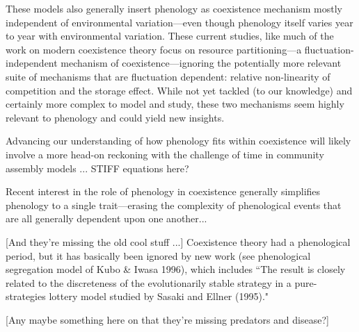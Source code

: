 \documentclass[11pt]{article}
\begin{document}
These models also generally insert phenology as coexistence mechanism mostly independent of environmental variation---even though phenology itself varies year to year with environmental variation. These current studies, like much of the work on modern coexistence theory focus on resource partitioning---a fluctuation-independent mechanism of coexistence---ignoring the potentially more relevant suite of mechanisms that are fluctuation dependent: relative non-linearity of competition and the storage effect. While not yet tackled (to our knowledge) and certainly more complex to model and study, these two mechanisms seem highly relevant to phenology and could yield new insights. 

Advancing our understanding of how phenology fits within coexistence will likely involve a more head-on reckoning with the challenge of time in community assembly models ... STIFF equations here? 

Recent interest in the role of phenology in coexistence generally simplifies phenology to a single trait---erasing the complexity of phenological events that are all generally dependent upon one another... 

[And they're missing the old cool stuff ...] Coexistence theory had a phenological period, but it has basically been ignored by new work (see phenological segregation model of Kubo \& Iwasa 1996), which includes ``The result is closely related to the discreteness of the evolutionarily stable strategy in a pure-strategies lottery model studied by Sasaki and Ellner (1995)." 

[Any maybe something here on that they're missing predators and disease?]
\end{document}
